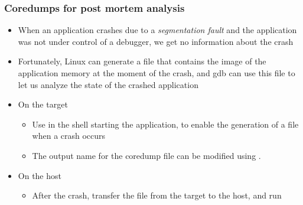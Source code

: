 \begin{frame}
  \frametitle{Coredumps for post mortem analysis}
  \begin{itemize}
  \item When an application crashes due to a {\em segmentation fault}
    and the application was not under control of a debugger, we get no
    information about the crash
  \item Fortunately, Linux can generate a  file that
    contains the image of the application memory at the moment of the
    crash, and gdb can use this  file to let us analyze the
    state of the crashed application
  \item On the target
    \begin{itemize}
    \item Use  in the shell starting the
      application, to enable the generation of a  file
      when a crash occurs
    \item The output name for the coredump file can be modified using
      .
    \end{itemize}
  \item On the host
    \begin{itemize}
    \item After the crash, transfer the  file from the target to
      the host, and run
    \end{itemize}
  \end{itemize}
\end{frame}
